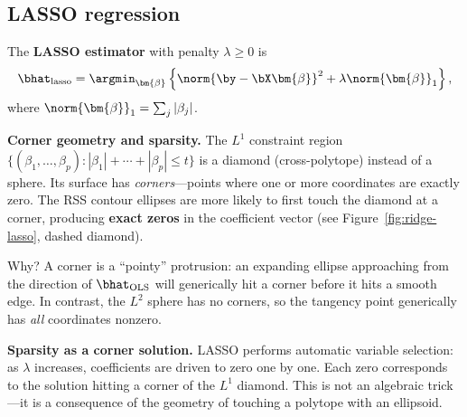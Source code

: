\subsection{LASSO regression}

\begin{definition}
The \textbf{LASSO estimator} with penalty $\lambda\ge 0$ is
\[
  \bhat_{\text{lasso}}
  = \argmin_{\bm{\beta}}\left\{
      \norm{\by-\bX\bm{\beta}}^2 + \lambda\norm{\bm{\beta}}_1
    \right\},
\]
where $\norm{\bm{\beta}}_1 = \sum_j|\beta_j|$.
\end{definition}

\noindent\textbf{Corner geometry and sparsity.}
The $L^1$ constraint region
$\{(\beta_1,\dots,\beta_p) : |\beta_1|+\cdots+|\beta_p| \le t\}$
is a diamond (cross-polytope) instead of a sphere.
Its surface has \emph{corners}---points where one or more coordinates
are exactly zero.
The RSS contour ellipses are more likely to first touch the diamond
at a corner, producing \textbf{exact zeros} in the coefficient vector
(see Figure~\ref{fig:ridge-lasso}, dashed diamond).

Why?
A corner is a ``pointy'' protrusion: an expanding ellipse approaching
from the direction of $\bhat_{\text{OLS}}$ will generically hit a
corner before it hits a smooth edge.
In contrast, the $L^2$ sphere has no corners, so the tangency point
generically has \emph{all} coordinates nonzero.

\medskip
\noindent\textbf{Sparsity as a corner solution.}
LASSO performs automatic variable selection: as $\lambda$ increases,
coefficients are driven to zero one by one.
Each zero corresponds to the solution hitting a corner of the $L^1$
diamond.
This is not an algebraic trick---it is a consequence of the geometry
of touching a polytope with an ellipsoid.

